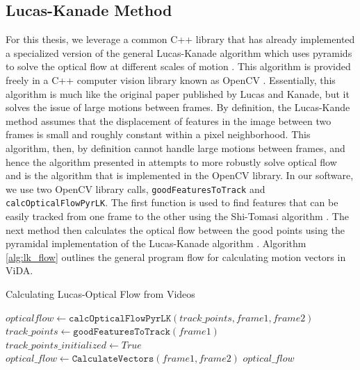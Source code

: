 \subsection{\label{subsection:lucas_kanade} Lucas-Kanade Method} For this
thesis, we leverage a common C++ library that has already implemented a
specialized version of the general Lucas-Kanade algorithm which uses pyramids to
solve the optical flow at different scales of motion
\cite{bouguet2001pyramidal}. This algorithm is provided freely in a C++ computer
vision library known as OpenCV \cite{itseez2015opencv}. Essentially, this
algorithm is much like the original paper published by Lucas and Kanade, but it
solves the issue of large motions between frames. By definition, the Lucas-Kande
method assumes that the displacement of features in the image between two frames
is small and roughly constant within a pixel neighborhood. This algorithm, then,
by definition cannot handle large motions between frames, and hence the algorithm
presented in \cite{bouguet2001pyramidal} attempts to more robustly solve
optical flow and is the algorithm that is implemented in the OpenCV \cite{itseez2015opencv}
library. In our software, we use two OpenCV library calls, \texttt{goodFeaturesToTrack}
and \texttt{calcOpticalFlowPyrLK}. The first function is used to find features
that can be easily tracked from one frame to the other using the Shi-Tomasi
algorithm \cite{shi1994good}. The next method then calculates the optical flow
between the good points using the pyramidal implementation of the Lucas-Kanade
algorithm \cite{bouguet2001pyramidal}. Algorithm \ref{alg:lk_flow} outlines the general
program flow for calculating motion vectors in ViDA.

\begin{algorithm}
\caption{Calculating Lucas-Optical Flow from Videos}
\label{alg:lk_flow}
\begin{algorithmic}[1]
  	\State $opticalflow \gets \texttt{calcOpticalFlowPyrLK}(track\_points, frame1, frame2)$
  \Else
  	\State $track\_points \gets \texttt{goodFeaturesToTrack}(frame1)$
	\State $track\_points\_initialized \gets True$
	\State $optical\_flow \gets  \texttt{CalculateVectors}(frame1, frame2)$
  \EndIf
  \Return $optical\_flow$
\EndProcedure
\end{algorithmic}
\end{algorithm}

